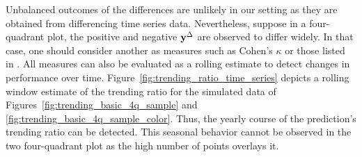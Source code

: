 Unbalanced outcomes of the differences are unlikely in our setting as they are obtained from differencing time series data.
Nevertheless, suppose in a four-quadrant plot, the positive and negative $\mathbf{y}^{\Delta}$ are observed to differ widely. In that case, one should consider another as measures such as Cohen's $\kappa$ or those listed in \textcite[Table 3.3]{Jolliffe2012}.
All measures can also be evaluated as a rolling estimate to detect changes in performance over time.
Figure~\ref{fig:trending_ratio_time_series} depicts a rolling window estimate of the trending ratio for the simulated data of Figures~\ref{fig:trending_basic_4q_sample} and \ref{fig:trending_basic_4q_sample_color}.
Thus, the yearly course of the prediction's trending ratio can be detected.
This seasonal behavior cannot be observed in the two four-quadrant plot as the high number of points overlays it.

